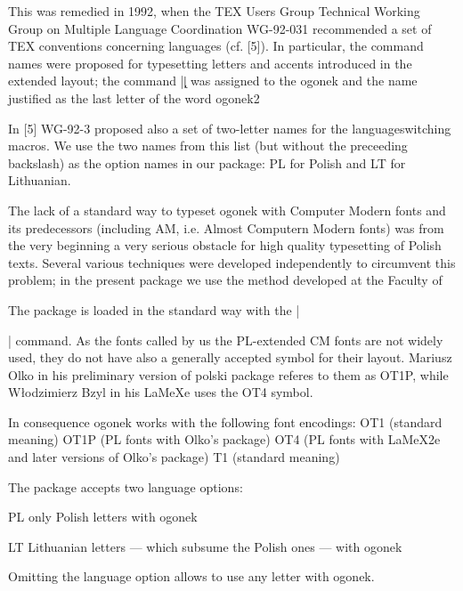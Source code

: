 This was remedied in 1992, when the TEX Users Group Technical Working Group
on Multiple Language Coordination WG-92-031 recommended a set of TEX conventions
concerning languages (cf. [5]). In particular, the command names were
proposed for typesetting letters and accents introduced in the extended layout;
the command |\k|  was assigned to the ogonek and the name justified as the last
letter of the word ogonek2

In [5] WG-92-3 proposed also a set of two-letter names for the languageswitching
macros. We use the two names from this list (but without the preceeding
backslash) as the option names in our package: PL for Polish and LT for
Lithuanian.

The lack of a standard way to typeset ogonek with Computer Modern fonts and
its predecessors (including AM, i.e. Almost Computern Modern fonts) was from
the very beginning a very serious obstacle for high quality typesetting of Polish
texts. Several various techniques were developed independently to circumvent this
problem; in the present package we use the method developed at the Faculty of

The package is loaded in the standard way with the |\usepackage{ogonek}|  command.
As the fonts called by us the PL-extended CM fonts are not widely used, they
do not have also a generally accepted symbol for their layout. Mariusz Olko in his
preliminary version of polski package referes to them as OT1P, while Włodzimierz
Bzyl in his LaMeXe uses the OT4 symbol. 

In consequence ogonek works with the
following font encodings: OT1 (standard meaning) OT1P (PL fonts with Olko’s
package) OT4 (PL fonts with LaMeX2e and later versions of Olko’s package) T1
(standard meaning)

The package accepts two language options:

PL only Polish letters with ogonek

LT Lithuanian letters — which subsume the Polish ones — with ogonek

Omitting the language option allows to use any letter with ogonek.

%
%
%
%
%


